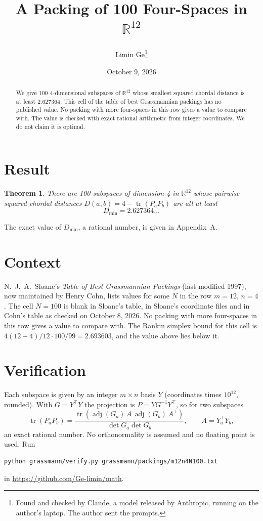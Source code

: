 \documentclass[11pt,a4paper]{article}
\title{A Packing of 100 Four-Spaces in $\mathbb{R}^{12}$}
\author{Limin Ge\thanks{Found and checked by Claude, a model released by Anthropic, running on the author's laptop. The author sent the prompts.}}
\date{October 9, 2026}
\newtheorem*{theorem}{Theorem}
\begin{document}
\maketitle
\begin{abstract}
We give 100 4-dimensional subspaces of $\mathbb{R}^{12}$ whose smallest squared chordal distance is at least 2.627364. This cell of the table of best Grassmannian packings has no published value. No packing with more four-spaces in this row gives a value to compare with. The value is checked with exact rational arithmetic from integer coordinates. We do not claim it is optimal.
\end{abstract}

\section{Result}
\begin{theorem}
There are 100 subspaces of dimension 4 in $\mathbb{R}^{12}$ whose pairwise squared chordal distances $D(a,b) = 4 - \operatorname{tr}(P_aP_b)$ are all at least
\[ D_{\min} = 2.627364\ldots \]
\end{theorem}
The exact value of $D_{\min}$, a rational number, is given in Appendix~A.


\section{Context}
N.~J.~A.~Sloane's \emph{Table of Best Grassmannian Packings} (last modified 1997), now maintained by Henry Cohn, lists values for some $N$ in the row $m=12$, $n=4$. The cell $N=100$ is blank in Sloane's table, in Sloane's coordinate files and in Cohn's table as checked on October 8, 2026. No packing with more four-spaces in this row gives a value to compare with. The Rankin simplex bound for this cell is $4(12-4)/12\cdot 100/99 = 2.693603$, and the value above lies below it.


\section{Verification}
Each subspace is given by an integer $m\times n$ basis $Y$ (coordinates times $10^{12}$, rounded). With $G=Y^\top Y$ the projection is $P=YG^{-1}Y^\top$, so for two subspaces
\[ \operatorname{tr}(P_aP_b)=\frac{\operatorname{tr}(\operatorname{adj}(G_a)\,A\,\operatorname{adj}(G_b)\,A^\top)}{\det G_a\det G_b},\qquad A=Y_a^\top Y_b, \]
an exact rational number. No orthonormality is assumed and no floating point is used. Run
\begin{verbatim}
python grassmann/verify.py grassmann/packings/m12n4N100.txt
\end{verbatim}
in \url{https://github.com/Ge-limin/math}.
\end{document}
